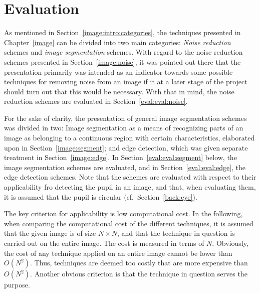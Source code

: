 
\section{Evaluation}
\label{eval:eval}

As mentioned in Section~\ref{image:intro:categories}, the techniques
presented in Chapter~\ref{image} can be divided into two main
categories: {\em Noise reduction\/} schemes and {\em image
  segmentation\/} schemes.  With regard to the noise reduction schemes
presented in Section~\ref{image:noise}, it was pointed out there that
the presentation primarily was intended as an indicator towards some
possible techniques for removing noise from an image if it at a later
stage of the project should turn out that this would be necessary.
With that in mind, the noise reduction schemes are evaluated in
Section~\ref{eval:eval:noise}.

For the sake of clarity, the presentation of general image
segmentation schemes was divided in two: Image segmentation as a means
of recognizing parts of an image as belonging to a continuous region
with certain characteristics, elaborated upon in
Section~\ref{image:segment}; and edge detection, which was given
separate treatment in Section~\ref{image:edge}.  In
Section~\ref{eval:eval:segment} below, the image segmentation schemes
are evaluated, and in Section~\ref{eval:eval:edge}, the edge detection
schemes.  Note that the schemes are evaluated with respect to their
applicability fro detecting the pupil in an image, and that, when
evaluating them, it is assumed that the pupil is circular (cf.\
Section~\ref{back:eye}).

The key criterion for applicability is low computational cost.  In the
following, when comparing the computational cost of the different
techniques, it is assumed that the given image is of size $N\times N$,
and that the technique in question is carried out on the entire image.
The cost is measured in terms of $N$.  Obviously, the cost of any
technique applied on an entire image cannot be lower than $O(N^{2})$.
Thus, techniques are deemed too costly that are more expensive than
$O(N^{2})$.  Another obvious criterion is that the technique in
question serves the purpose.

